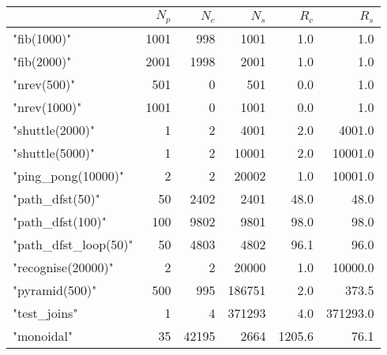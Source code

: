 \begin{tabular}{@{}l@{\qquad}rrrrr@{}}
 & $N_p$ & $N_c$ & $N_s$ & $R_c$ & $R_s$\\
\hline{"fib(1000)"} & 1001 & 998 & 1001 & 1.0 & 1.0\\
{"fib(2000)"} & 2001 & 1998 & 2001 & 1.0 & 1.0\\
{"nrev(500)"} & 501 & 0 & 501 & 0.0 & 1.0\\
{"nrev(1000)"} & 1001 & 0 & 1001 & 0.0 & 1.0\\
{"shuttle(2000)"} & 1 & 2 & 4001 & 2.0 & 4001.0\\
{"shuttle(5000)"} & 1 & 2 & 10001 & 2.0 & 10001.0\\
{"ping_pong(10000)"} & 2 & 2 & 20002 & 1.0 & 10001.0\\
{"path_dfst(50)"} & 50 & 2402 & 2401 & 48.0 & 48.0\\
{"path_dfst(100)"} & 100 & 9802 & 9801 & 98.0 & 98.0\\
{"path_dfst_loop(50)"} & 50 & 4803 & 4802 & 96.1 & 96.0\\
{"recognise(20000)"} & 2 & 2 & 20000 & 1.0 & 10000.0\\
{"pyramid(500)"} & 500 & 995 & 186751 & 2.0 & 373.5\\
{"test_joins"} & 1 & 4 & 371293 & 4.0 & 371293.0\\
{"monoidal"} & 35 & 42195 & 2664 & 1205.6 & 76.1\\
\hline\end{tabular}
